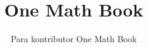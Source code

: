 \documentclass[11pt,a4paper,twoside,openany]{book}
\title{One Math Book}
\author{Para kontributor One Math Book}
\date{\bookdate}
\begin{document}
\frontmatter



\tableofcontents

\mainmatter





\appendix
\part{\omsolutionspart}




\backmatter
\printindex
\end{document}

